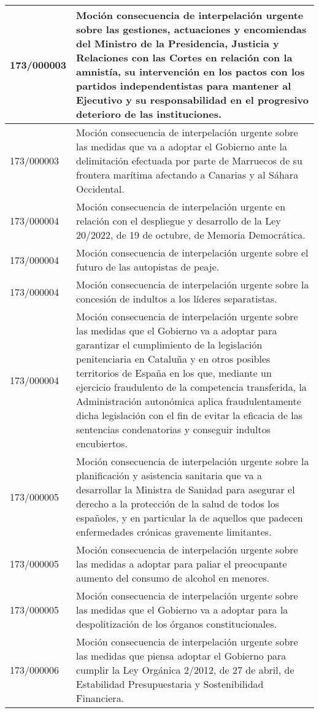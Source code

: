 {\begin{table}[H]
\begin{center}
\begin{tabularx}{\linewidth}{| l | X |}
\hline
173/000003 & Moción consecuencia de interpelación urgente sobre las gestiones, actuaciones y encomiendas del Ministro de la Presidencia, Justicia y Relaciones con las Cortes en relación con la amnistía, su intervención en los pactos con los partidos independentistas para mantener al Ejecutivo y su responsabilidad en el progresivo deterioro de las instituciones. \\
\hline
173/000003 & Moción consecuencia de interpelación urgente sobre las medidas que va a adoptar el Gobierno ante la delimitación efectuada por parte de Marruecos de su frontera marítima afectando a Canarias y al Sáhara Occidental. \\
\hline
173/000004 & Moción consecuencia de interpelación urgente en relación con el despliegue y desarrollo de la Ley 20/2022, de 19 de octubre, de Memoria Democrática. \\
\hline
173/000004 & Moción consecuencia de interpelación urgente sobre el futuro de las autopistas de peaje. \\
\hline
173/000004 & Moción consecuencia de interpelación urgente sobre la concesión de indultos a los líderes separatistas. \\
\hline
173/000004 & Moción consecuencia de interpelación urgente sobre las medidas que el Gobierno va a adoptar para garantizar el cumplimiento de la legislación penitenciaria en Cataluña y en otros posibles territorios de España en los que, mediante un ejercicio fraudulento de la competencia transferida, la Administración autonómica aplica fraudulentamente dicha legislación con el fin de evitar la eficacia de las sentencias condenatorias y conseguir indultos encubiertos. \\
\hline
173/000005 & Moción consecuencia de interpelación urgente sobre la planificación y asistencia sanitaria que va a desarrollar la Ministra de Sanidad para asegurar el derecho a la protección de la salud de todos los españoles, y en particular la de aquellos que padecen enfermedades crónicas gravemente limitantes. \\
\hline
173/000005 & Moción consecuencia de interpelación urgente sobre las medidas a adoptar para paliar el preocupante aumento del consumo de alcohol en menores. \\
\hline
173/000005 & Moción consecuencia de interpelación urgente sobre las medidas que el Gobierno va a adoptar para la despolitización de los órganos constitucionales. \\
\hline
173/000006 & Moción consecuencia de interpelación urgente sobre las medidas que piensa adoptar el Gobierno para cumplir la Ley Orgánica 2/2012, de 27 de abril, de Estabilidad Presupuestaria y Sostenibilidad Financiera. \\

\end{tabularx}
\end{center}
\end{table}}
